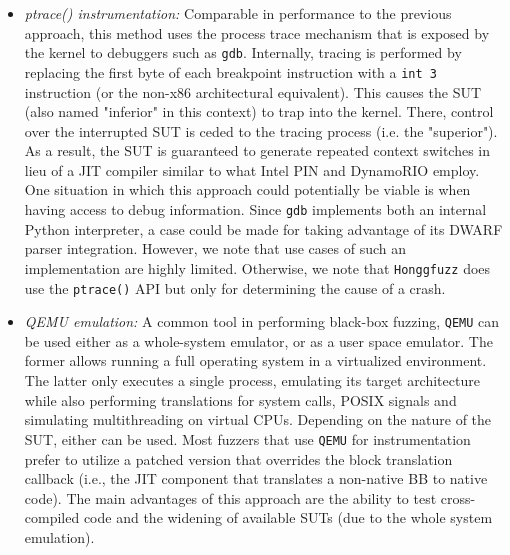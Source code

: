 \begin{itemize}
    \item \textit{ptrace() instrumentation:} Comparable in performance to the previous approach, this method uses the process trace mechanism that is exposed by the kernel to debuggers such as \texttt{gdb}. Internally, tracing is performed by replacing the first byte of each breakpoint instruction with a \texttt{int 3} instruction (or the non-x86 architectural equivalent). This causes the SUT (also named "inferior" in this context) to trap into the kernel. There, control over the interrupted SUT is ceded to the tracing process (i.e. the "superior"). As a result, the SUT is guaranteed to generate repeated context switches in lieu of a JIT compiler similar to what Intel PIN and DynamoRIO employ. One situation in which this approach could potentially be viable is when having access to debug information. Since \texttt{gdb} implements both an internal Python interpreter, a case could be made for taking advantage of its DWARF parser integration. However, we note that use cases of such an implementation are highly limited. Otherwise, we note that \texttt{Honggfuzz} \cite{honggfuzz} does use the \texttt{ptrace()} API but only for determining the cause of a crash.

    \item \textit{QEMU emulation:} A common tool in performing black-box fuzzing, \texttt{QEMU} can be used either as a whole-system emulator, or as a user space emulator. The former allows running a full operating system in a virtualized environment. The latter only executes a single process, emulating its target architecture while also performing translations for system calls, POSIX signals and simulating multithreading on virtual CPUs. Depending on the nature of the SUT, either can be used. Most fuzzers that use \texttt{QEMU} for instrumentation prefer to utilize a patched version that overrides the block translation callback (i.e., the JIT component that translates a non-native BB to native code). The main advantages of this approach are the ability to test cross-compiled code and the widening of available SUTs (due to the whole system emulation).


\end{itemize}
